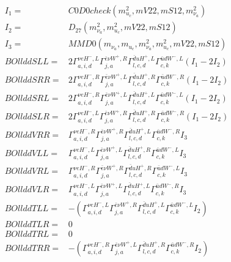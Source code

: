 \documentclass[A4,landscape]{article}
\begin{document}
\begin{align} 
I_1 = & C0D0check(m^2_{u_{{c}}}, mV22, mS12, m^2_{\nu_{{a}}}) \\ 
I_2 = & D_{27}(m^2_{\nu_{{a}}}, m^2_{u_{{c}}}, mV22, mS12) \\ 
I_3 = & MMD0(m_{\nu_{{a}}}, m_{u_{{c}}}, m^2_{\nu_{{a}}}, m^2_{u_{{c}}}, mV22, mS12) \\ 
  BOllddSLL= & 2  \Gamma^{\nu e H^- ,L}_{a, i, d} \Gamma^{\bar{e}\nu W^+ ,R}_{j, a} \Gamma^{\bar{d}u H^+,L}_{l, c, d} \Gamma^{\bar{u}d W^-,L}_{c, k} (I_1 - 2 I_2) \\ 
  BOllddSRR= & 2  \Gamma^{\nu e H^- ,R}_{a, i, d} \Gamma^{\bar{e}\nu W^+ ,L}_{j, a} \Gamma^{\bar{d}u H^+,R}_{l, c, d} \Gamma^{\bar{u}d W^-,R}_{c, k} (I_1 - 2 I_2) \\ 
  BOllddSRL= & 2  \Gamma^{\nu e H^- ,R}_{a, i, d} \Gamma^{\bar{e}\nu W^+ ,L}_{j, a} \Gamma^{\bar{d}u H^+,L}_{l, c, d} \Gamma^{\bar{u}d W^-,L}_{c, k} (I_1 - 2 I_2) \\ 
  BOllddSLR= & 2  \Gamma^{\nu e H^- ,L}_{a, i, d} \Gamma^{\bar{e}\nu W^+ ,R}_{j, a} \Gamma^{\bar{d}u H^+,R}_{l, c, d} \Gamma^{\bar{u}d W^-,R}_{c, k} (I_1 - 2 I_2) \\ 
  BOllddVRR= &  \Gamma^{\nu e H^- ,R}_{a, i, d} \Gamma^{\bar{e}\nu W^+ ,R}_{j, a} \Gamma^{\bar{d}u H^+,L}_{l, c, d} \Gamma^{\bar{u}d W^-,R}_{c, k} I_3 \\ 
  BOllddVLL= &  \Gamma^{\nu e H^- ,L}_{a, i, d} \Gamma^{\bar{e}\nu W^+ ,L}_{j, a} \Gamma^{\bar{d}u H^+,R}_{l, c, d} \Gamma^{\bar{u}d W^-,L}_{c, k} I_3 \\ 
  BOllddVRL= &  \Gamma^{\nu e H^- ,R}_{a, i, d} \Gamma^{\bar{e}\nu W^+ ,R}_{j, a} \Gamma^{\bar{d}u H^+,R}_{l, c, d} \Gamma^{\bar{u}d W^-,L}_{c, k} I_3 \\ 
  BOllddVLR= &  \Gamma^{\nu e H^- ,L}_{a, i, d} \Gamma^{\bar{e}\nu W^+ ,L}_{j, a} \Gamma^{\bar{d}u H^+,L}_{l, c, d} \Gamma^{\bar{u}d W^-,R}_{c, k} I_3 \\ 
  BOllddTLL= & -( \Gamma^{\nu e H^- ,L}_{a, i, d} \Gamma^{\bar{e}\nu W^+ ,R}_{j, a} \Gamma^{\bar{d}u H^+,L}_{l, c, d} \Gamma^{\bar{u}d W^-,L}_{c, k} I_2) \\ 
  BOllddTLR= & 0 \\ 
  BOllddTRL= & 0 \\ 
  BOllddTRR= & -( \Gamma^{\nu e H^- ,R}_{a, i, d} \Gamma^{\bar{e}\nu W^+ ,L}_{j, a} \Gamma^{\bar{d}u H^+,R}_{l, c, d} \Gamma^{\bar{u}d W^-,R}_{c, k} I_2) \\ 
\end{align} 
\end{document}
